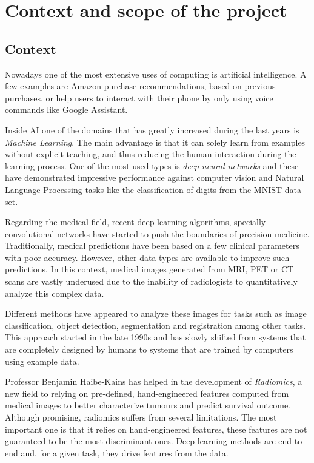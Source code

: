 
\section{Context and scope of the project}
\subsection{Context}

Nowadays one of the most extensive uses of computing is artificial intelligence. A few 
examples are Amazon purchase recommendations, based on previous purchases, or help users
to interact with their phone by only using voice commands like Google Assistant. 
~\cites{neural:amazon}{neural:google-assistant}

Inside AI one of the domains that has greatly increased during the last years is 
\emph{Machine Learning}. The main advantage is that it can solely learn from examples without 
explicit teaching, and thus reducing the human interaction during the learning process. One of the 
most used types is \emph{deep neural networks} and these have demonstrated impressive performance 
against computer vision and Natural Language Processing tasks like the classification of 
digits from the MNIST data set.
~\cites{neural:mnist}{neural:empirical-evaluation-deep-architectures}

Regarding the medical field, recent deep learning algorithms, specially convolutional networks 
have started to push the boundaries of precision medicine. 
Traditionally, medical predictions have been based on a few clinical parameters with poor accuracy.
However, other data types are available to improve such predictions. In this context, medical
images generated from MRI, PET or CT scans are vastly underused due to the inability of radiologists
to quantitatively analyze this complex data.

Different methods have appeared to analyze these images for tasks such as
image classification, object detection, segmentation and registration among other tasks. This
approach started in the late 1990s and has slowly shifted from systems that are completely designed
by humans to systems that are trained by computers using example data. 
~\cite{medical:survey-deep-learning}

Professor Benjamin Haibe-Kains has helped in the development of \emph{Radiomics}, a new field to
relying on pre-defined, hand-engineered features computed from medical images to better 
characterize tumours and predict survival outcome. Although promising, radiomics suffers from 
several limitations. The most important one is that it relies on hand-engineered features,
these features are not guaranteed to be the most discriminant ones. Deep learning methods
are end-to-end and, for a given task, they drive features from the data.
~\cite{medical:radiomics-ml-classifiers}

